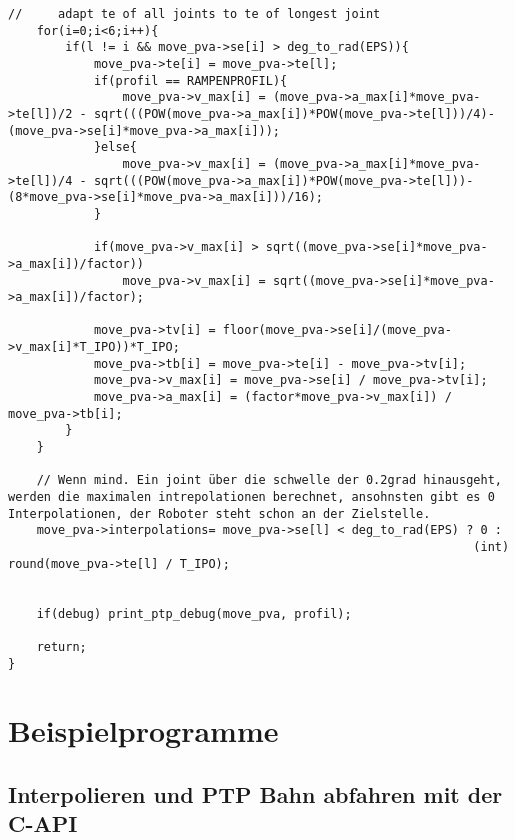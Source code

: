 \documentclass[
a4paper,
12pt,
oneside,
headsepline,		%
footsepline,		%
]{scrbook}
\begin{document}
\begin{lstlisting}
//     adapt te of all joints to te of longest joint
    for(i=0;i<6;i++){
        if(l != i && move_pva->se[i] > deg_to_rad(EPS)){
            move_pva->te[i] = move_pva->te[l];
            if(profil == RAMPENPROFIL){
                move_pva->v_max[i] = (move_pva->a_max[i]*move_pva->te[l])/2 - sqrt(((POW(move_pva->a_max[i])*POW(move_pva->te[l]))/4)-(move_pva->se[i]*move_pva->a_max[i]));
            }else{
                move_pva->v_max[i] = (move_pva->a_max[i]*move_pva->te[l])/4 - sqrt(((POW(move_pva->a_max[i])*POW(move_pva->te[l]))-(8*move_pva->se[i]*move_pva->a_max[i]))/16);
            }

            if(move_pva->v_max[i] > sqrt((move_pva->se[i]*move_pva->a_max[i])/factor))
                move_pva->v_max[i] = sqrt((move_pva->se[i]*move_pva->a_max[i])/factor);

            move_pva->tv[i] = floor(move_pva->se[i]/(move_pva->v_max[i]*T_IPO))*T_IPO;
            move_pva->tb[i] = move_pva->te[i] - move_pva->tv[i];
            move_pva->v_max[i] = move_pva->se[i] / move_pva->tv[i];
            move_pva->a_max[i] = (factor*move_pva->v_max[i]) /  move_pva->tb[i];
        }
    }

    // Wenn mind. Ein joint über die schwelle der 0.2grad hinausgeht, werden die maximalen intrepolationen berechnet, ansohnsten gibt es 0 Interpolationen, der Roboter steht schon an der Zielstelle.
    move_pva->interpolations= move_pva->se[l] < deg_to_rad(EPS) ? 0 :
                                                                 (int) round(move_pva->te[l] / T_IPO);


    if(debug) print_ptp_debug(move_pva, profil);

    return;
}
\end{lstlisting}

\chapter{Beispielprogramme}

\section{Interpolieren und PTP Bahn abfahren mit der C-API}
\end{document}
